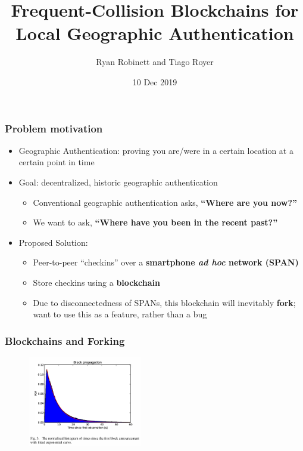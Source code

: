 \documentclass{beamer}
\begin{document}
\title{Frequent-Collision Blockchains for Local Geographic Authentication}
\author{Ryan Robinett and Tiago Royer}
\date{10 Dec 2019}

\begin{frame}
    \titlepage
\end{frame}

\begin{frame}
	\frametitle{Problem motivation}

	\begin{itemize}
		\item Geographic Authentication:
			proving you are/were in a certain location
			at a certain point in time
		\item Goal: decentralized, historic geographic authentication
			\begin{itemize}
				\item Conventional geographic authentication asks, \textbf{``Where are you now?''}
				\item We want to ask, \textbf{``Where have you been in the recent past?''}
			\end{itemize}
		\item Proposed Solution:
			\begin{itemize}
				\item Peer-to-peer ``checkins'' over a \textbf{smartphone
					\textit{ad hoc} network (SPAN)}
				\item Store checkins using a \textbf{blockchain}
				\item Due to disconnectedness of SPANs, this blockchain will
					inevitably \textbf{fork}; want to use this as a feature,
					rather than a bug
			\end{itemize}
	\end{itemize}
\end{frame}

\begin{frame}
	\frametitle{Blockchains and Forking}

	\begin{figure}
		\centering
		\includegraphics[width=5cm]{decker_figures/decker_3.png}
	\end{figure}
\end{frame}
\end{document}
